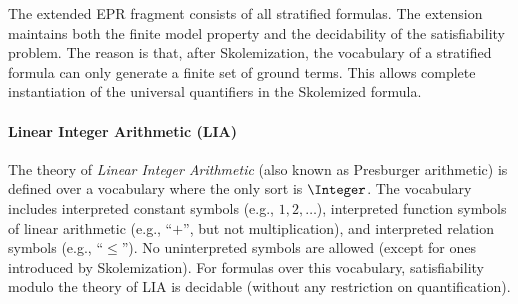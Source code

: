 The extended EPR fragment consists of all stratified formulas. The extension maintains both the finite model property and the decidability of the satisfiability
problem. The reason is that, after Skolemization, the vocabulary of a stratified
formula can only generate a finite set of ground terms. This allows
complete instantiation of the universal quantifiers in the Skolemized
formula.


\paragraph{Linear Integer Arithmetic (LIA)}
The theory of \emph{Linear Integer Arithmetic} (also known as Presburger arithmetic) is defined over a vocabulary where the only sort is $\Integer$. The vocabulary includes interpreted constant symbols (e.g., $1,2,\ldots$), interpreted function symbols of linear arithmetic (e.g., ``$+$'', but not multiplication), and interpreted relation symbols (e.g., ``$\leq$''). 
No uninterpreted symbols are allowed (except for ones introduced by Skolemization).
For formulas over this vocabulary, satisfiability modulo the theory of LIA is decidable (without any restriction on quantification).


